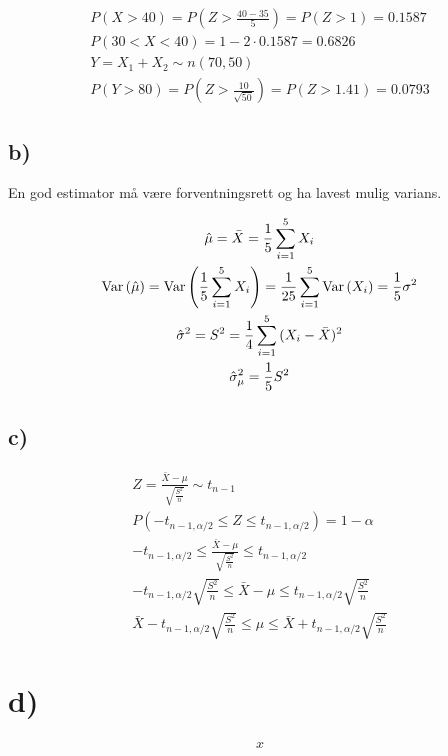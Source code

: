 \begin{gather*}
	P(X > 40) = P\left(Z > \frac{40 - 35}{5}\right) = P(Z > 1) = 0.1587
	\\
	P(30 < X < 40) = 1 - 2 \cdot 0.1587 = 0.6826
	\\
	Y = X_1 + X_2 \sim n(70, 50)
	\\
	P(Y > 80) = P\left(Z > \frac{10}{\sqrt{50}}\right) = P(Z > 1.41) = 0.0793
\end{gather*}


\subsection*{b)}

En god estimator må være forventningsrett og ha lavest mulig varians.

\begin{gather*}
	\hat \mu = \bar X = \frac{1}{5} \sum_{i = 1}^5{X_i}
	\\
	\text{Var}\left(\hat \mu\right) = \text{Var}\left(\frac{1}{5} \sum_{i = 1}^5{X_i}\right) = \frac{1}{25} \sum_{i = 1}^5{\text{Var}\left(X_i\right)} = \frac{1}{5} \sigma^2
	\\
	\hat \sigma^2 = S^2 = \frac{1}{4} \sum_{i = 1}^5{(X_i - \bar X)^2}
	\\
	\hat \sigma_\mu^2 = \frac{1}{5} S^2
\end{gather*}


\subsection*{c)}

\begin{gather*}	
	Z = \frac{\bar X - \mu}{\sqrt{\frac{S^2}{n}}} \sim t_{n - 1}
	\\
	P(-t_{n - 1, \alpha / 2} \leq Z \leq t_{n - 1, \alpha / 2}) = 1 - \alpha
	\\
	-t_{n - 1, \alpha / 2} \leq \frac{\bar X - \mu}{\sqrt{\frac{S^2}{n}}} \leq t_{n - 1, \alpha / 2}
	\\
	-t_{n - 1, \alpha / 2} \sqrt{\frac{S^2}{n}} \leq \bar X - \mu \leq t_{n - 1, \alpha / 2} \sqrt{\frac{S^2}{n}}
	\\
	\bar X - t_{n - 1, \alpha / 2} \sqrt{\frac{S^2}{n}} \leq \mu \leq \bar X + t_{n - 1, \alpha / 2} \sqrt{\frac{S^2}{n}}
\end{gather*}


\section*{d)}

\begin{gather*}
	x
\end{gather*}

